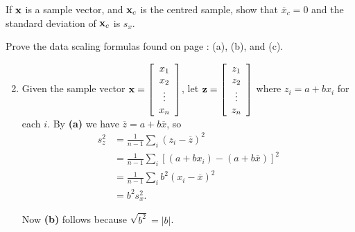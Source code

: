 \begin{ex}
If $\textbf{x}$ is a sample vector, and $\textbf{x}_{c}$ is the centred sample, show that $\overline{x}_{c} = 0$ and the standard deviation of $\textbf{x}_{c}$ is $s_{x}$.
\end{ex}

\begin{ex}
Prove the data scaling formulas found on page \pageref{thm:017436}: (a), (b), and (c).

\begin{sol}
\begin{enumerate}[label={\alph*.}]
\setcounter{enumi}{1}
\item  Given the sample vector 
$\textbf{x} = \left[ \begin{array}{c}
x_1 \\
x_2 \\
\vdots \\
x_n
\end{array} \right]$, let $\textbf{z} =
\left[ \begin{array}{c}
z_1 \\
z_2 \\
\vdots \\
z_n
\end{array} \right]$ where $z_{i} = a + bx_{i}$ for each $i$. By \textbf{(a)} we have $\overline{z} = a + b\overline{x}$, so 
\begin{align*}
s_z^2 &= \frac{1}{n - 1}\sum_{i}(z_i - \overline{z})^2 \\
&= \frac{1}{n - 1}\sum_{i}[(a + bx_i) - (a + b\overline{x})]^2 \\
&= \frac{1}{n - 1}\sum_{i}b^2(x_i - \overline{x})^2 \\
&= b^2s_x^2.
\end{align*}

Now \textbf{(b)} follows because $\sqrt{b^2} = |b|$.
\end{enumerate}
\end{sol}
\end{ex}
